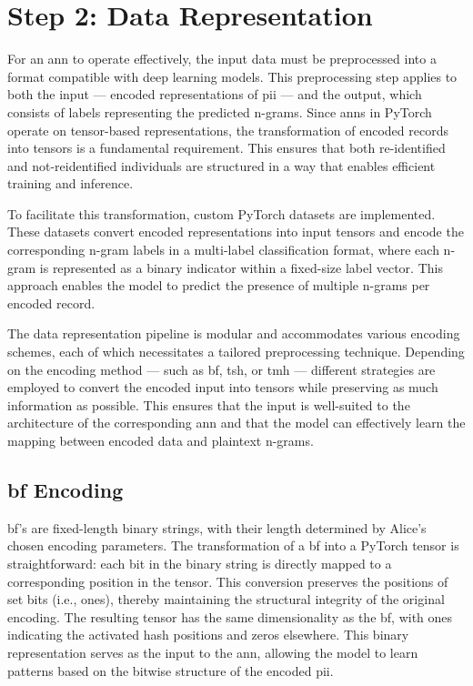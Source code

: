 \section{Step 2: Data Representation} \label{sec:representation}

For an \ac{ann} to operate effectively, the input data must be preprocessed into a format compatible with deep learning models.
This preprocessing step applies to both the input — encoded representations of \ac{pii} — and the output, which consists of labels representing the predicted n-grams.
Since \ac{ann}s in PyTorch operate on tensor-based representations, the transformation of encoded records into tensors is a fundamental requirement.
This ensures that both re-identified and not-reidentified individuals are structured in a way that enables efficient training and inference.

To facilitate this transformation, custom PyTorch datasets are implemented.
These datasets convert encoded representations into input tensors and encode the corresponding n-gram labels in a multi-label classification format, where each n-gram is represented as a binary indicator within a fixed-size label vector.
This approach enables the model to predict the presence of multiple n-grams per encoded record.

The data representation pipeline is modular and accommodates various encoding schemes, each of which necessitates a tailored preprocessing technique.
Depending on the encoding method — such as \ac{bf}, \ac{tsh}, or \ac{tmh} — different strategies are employed to convert the encoded input into tensors while preserving as much information as possible.
This ensures that the input is well-suited to the architecture of the corresponding \ac{ann} and that the model can effectively learn the mapping between encoded data and plaintext n-grams.

\subsection{\ac{bf} Encoding}

\ac{bf}'s are fixed-length binary strings, with their length determined by Alice’s chosen encoding parameters.
The transformation of a \ac{bf} into a PyTorch tensor is straightforward: each bit in the binary string is directly mapped to a corresponding position in the tensor.
This conversion preserves the positions of set bits (i.e., ones), thereby maintaining the structural integrity of the original encoding.
The resulting tensor has the same dimensionality as the \ac{bf}, with ones indicating the activated hash positions and zeros elsewhere.
This binary representation serves as the input to the \ac{ann}, allowing the model to learn patterns based on the bitwise structure of the encoded \ac{pii}.

